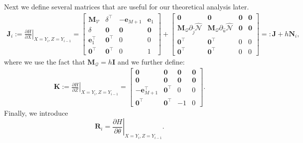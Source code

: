 \documentclass[12pt]{article}
\begin{document}
Next we define several matrices that are useful for our theoretical analysis later. 
\begin{align*}
\mathbf{J}_i := \left. \frac{\partial H}{\partial X} \right \vert_{X=Y_{i}, Z=Y_{i-1}}= 
\begin{bmatrix}
	\mathbf{M}_{\mathcal{V}} &  \delta^{\intercal} &  -\mathbf{e}_{M+1}  & \mathbf{e}_{1}   \\
	\delta  &  \mathbf{0}  &  \mathbf{0} & \mathbf{0} \\
	\mathbf{e}_1^{\intercal} & \mathbf{0}^{\intercal} & 0 & 0 \\
	\mathbf{0}^{\intercal} &  \mathbf{0}^{\intercal}  &  0  &  1
\end{bmatrix}
+ 
\begin{bmatrix}
	\mathbf{0}  &  \mathbf{0}  &  \mathbf{0}  & \mathbf{0} \\
	 \mathbf{M}_{\mathcal{Q}} \partial_{\hat{j}} \widehat{\mathcal{N}}  & \mathbf{M}_{\mathcal{Q}} \partial_{\hat{u}} \widehat{\mathcal{N}} & \mathbf{0} & \mathbf{0} \\
	 \mathbf{0}^{\intercal} &  \mathbf{0}^{\intercal} & 0 & 0 \\
	 \mathbf{0}^{\intercal} & \mathbf{0}^{\intercal} & 0 & 0 
\end{bmatrix}
=: \mathbf{J} + h \mathbf{N}_i,
\end{align*}
where we use the fact that $\mathbf{M}_{\mathcal{Q}} = h \mathbf{I}$ and we further define:
\begin{align*}
	\mathbf{K} :=  \left.  \frac{\partial H}{\partial Z} \right \vert_{X=Y_{i}, Z=Y_{i-1}} =
	\begin{bmatrix}
      \mathbf{0} & \mathbf{0} & \mathbf{0} & \mathbf{0} \\
      \mathbf{0} & \mathbf{0} & \mathbf{0} & \mathbf{0} \\
      - \mathbf{e}_{M+1}^\intercal & \mathbf{0}^{\intercal} & 0 & 0 \\
      \mathbf{0}^{\intercal} & \mathbf{0}^{\intercal} & -1 & 0
	\end{bmatrix}.
\end{align*}
Finally, we introduce 
\begin{equation*}
 \mathbf{R}_i  = \left. \frac{\partial H}{\partial \theta} \right \vert_{X=Y_{i}, Z=Y_{i-1}}.
\end{equation*}
\end{document}
